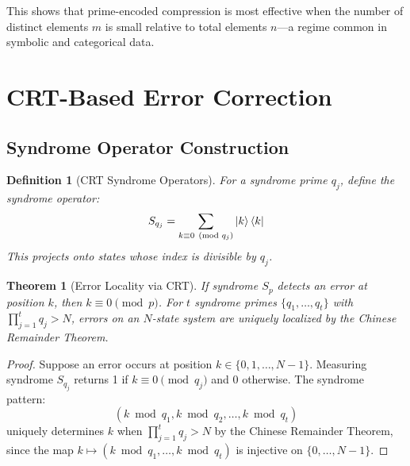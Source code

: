 \documentclass[12pt,a4paper]{article}
\newtheorem{definition}{Definition}[section]
\newtheorem{theorem}{Theorem}[section]
\begin{document}
This shows that prime-encoded compression is most effective when the number of distinct elements $m$ is small relative to total elements $n$---a regime common in symbolic and categorical data.

\section{CRT-Based Error Correction}
\label{sec:error_correction}

\subsection{Syndrome Operator Construction}

\begin{definition}[CRT Syndrome Operators]
\label{def:syndrome}
For a syndrome prime $q_j$, define the syndrome operator:
\begin{equation}
    S_{q_j} = \sum_{k \equiv 0 \pmod{q_j}} \ket{k}\bra{k}
\end{equation}
This projects onto states whose index is divisible by $q_j$.
\end{definition}

\begin{theorem}[Error Locality via CRT]
\label{thm:error_locality}
If syndrome $S_p$ detects an error at position $k$, then $k \equiv 0 \pmod{p}$. For $t$ syndrome primes $\{q_1, \ldots, q_t\}$ with $\prod_{j=1}^t q_j > N$, errors on an $N$-state system are uniquely localized by the Chinese Remainder Theorem.
\end{theorem}

\begin{proof}
Suppose an error occurs at position $k \in \{0, 1, \ldots, N-1\}$. Measuring syndrome $S_{q_j}$ returns 1 if $k \equiv 0 \pmod{q_j}$ and 0 otherwise. The syndrome pattern:
\begin{equation}
    (k \bmod q_1, k \bmod q_2, \ldots, k \bmod q_t)
\end{equation}
uniquely determines $k$ when $\prod_{j=1}^t q_j > N$ by the Chinese Remainder Theorem, since the map $k \mapsto (k \bmod q_1, \ldots, k \bmod q_t)$ is injective on $\{0, \ldots, N-1\}$.
\end{proof}
\end{document}
